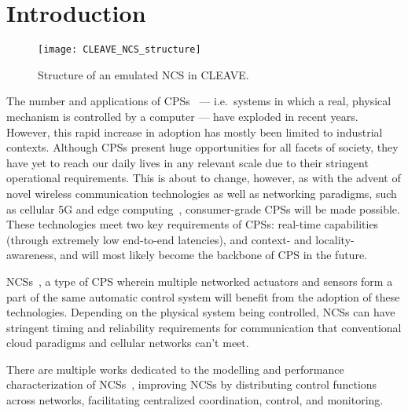 \section{Introduction}\label{sec:intro}

\begin{figure*}
    \centering
    \texttt{[image: CLEAVE\_NCS\_structure]}
    \caption{
        Structure of an emulated \acl*{NCS} in \acs*{CLEAVE}.
    }\label{fig:cleave:ncs:struct}
\end{figure*}

The number and applications of \acp{CPS}~\cite{Rajkumar2010CPS} --- i.e.\ systems in which a real, physical mechanism is controlled by a computer --- have exploded in recent years.
However, this rapid increase in adoption has mostly been limited to industrial contexts.
Although \acp{CPS} present huge opportunities for all facets of society, they have yet to reach our daily lives in any relevant scale due to their stringent operational requirements.
This is about to change, however, as with the advent of novel wireless communication technologies as well as networking paradigms, such as cellular 5G and edge computing~\cite{Satya2017Emergence}, consumer-grade \acp{CPS} will be made possible.
These technologies meet two key requirements of \acp{CPS}: real-time capabilities (through extremely low end-to-end latencies), and context- and locality-awareness, and will most likely become the backbone of \ac{CPS} in the future.

\acp{NCS}~\cite{Gupta2010NCSOverview}, a type of \ac{CPS} wherein multiple networked actuators and sensors form a part of the same automatic control system will benefit from the adoption of these technologies.
Depending on the physical system being controlled, \acp{NCS} can have stringent timing and reliability requirements for communication that conventional cloud paradigms and cellular networks can't meet\cite{Wan2020Efficient}.

There are multiple works dedicated to the modelling and performance characterization of \acp{NCS}~\cite{Zhang2013Survey,Zhang2016Survey}, improving NCSs by distributing control functions across networks, facilitating centralized coordination, control, and monitoring.


